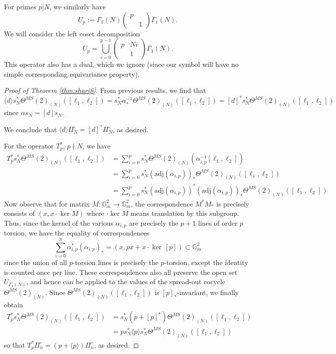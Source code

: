 \documentclass[10pt]{amsart}
\theoremstyle{definition}
\newcommand{\G}{\mathbb{G}}
\numberwithin{equation}{section}
\begin{document}
    For primes $p|N$, we similarly have 
    \[
    U_p:=\Gamma_1(N) \begin{pmatrix} p & \\ & 1 \end{pmatrix} \Gamma_1(N).
    \]
    We will consider the left coset decomposition
    \[
    U_p = \bigcup_{i=0}^{p-1} \begin{pmatrix}p & Ni \\ & 1 \end{pmatrix} \Gamma_1(N).
    \]
    This operator also has a dual, which we ignore (since our symbol will have no simple corresponding equivariance property).
    \begin{proof}[Proof of Theorem \ref{thm:sharifi}]
    From previous results, we find that 
    \[
    \langle d \rangle  s_N^*\Theta^{MS}(2)_{(N)}([\ell_1,\ell_2]) = s_N^* \alpha_*^{-1} \Theta^{MS}(2)_{(N)}([\ell_1,\ell_2]) = [d]^* s_N^*\Theta^{MS}(2)_{(N)}([\ell_1,\ell_2])
    \]
    since $\alpha s_N= [d] s_N$. 
    
    We conclude that $\langle d \rangle \Pi_N^\circ = [d]^* \Pi_N^\circ$, as desired.

    For the operator $T_p^*$, $p\nmid N$, we have
    \begin{align}
        T_p^* s_N^*\Theta^{MS}(2)_{(N)}([\ell_1,\ell_2]) &= \sum_{i=0}^p s_N^*\Theta^{MS}(2)_{(N)}(\alpha_{i,p}^{-1}[\ell_1,\ell_2]) \\
        & = \sum_{i=0}^p s_N^*(\mathrm{adj}(\alpha_{i,p}))_*\Theta^{MS}(2)_{(N)}([\ell_1,\ell_2]) 
        \\ 
        & = \sum_{i=0}^p s_N^*(\mathrm{adj}(\alpha_{i,p}))^*(\mathrm{adj}(\alpha_{i,p}))_*\Theta^{MS}(2)_{(N)}([\ell_1,\ell_2]) 
    \end{align}
    Now observe that for matrix $M:\G_m^2\to \G_m^2$, the correspondence $M^*M_*$ is precisely consists of $(x, x\cdot  \ker M)$ where $\cdot \ker M$ means translation by this subgroup. Thus, since the kernel of the various $\alpha_{i,p}$ are precisely the $p+1$ lines of order $p$ torsion, we have the equality of correspondences
    \[
    \sum_{i=0}^p \alpha_{i,p}^*(\alpha_{i,p})_* = (x, px + x\cdot \ker\,[p]) \subset \mathbb{G}_m^2
    \]
    since the union of all $p$-torsion lines is precisely the $p$-torsion, except the identity is counted once per line. These correspondences also all preserve the open set $U_{\Gamma_1(N)}$, and hence can be applied to the values of the spread-out cocycle $\Theta^{MS}(2)_{(N)}$. Since $\Theta^{MS}(2)_{(N)}([\ell_1,\ell_2])$ is $[p]_*$-invariant, we finally obtain 
    \begin{align}
        T_p^* s_N^*\Theta^{MS}(2)_{(N)}([\ell_1,\ell_2]) &= s_N^*(p+[p]^*)\Theta^{MS}(2)_{(N)}([\ell_1,\ell_2]) \\
        & = ps_N^* \langle p \rangle s_N^*\Theta^{MS}(2)_{(N)}([\ell_1,\ell_2]) 
    \end{align}
    so that $T_p^*\Pi_n^\circ = (p+\langle p \rangle)\Pi_n^\circ$, as desired.


\end{proof}
\end{document}
